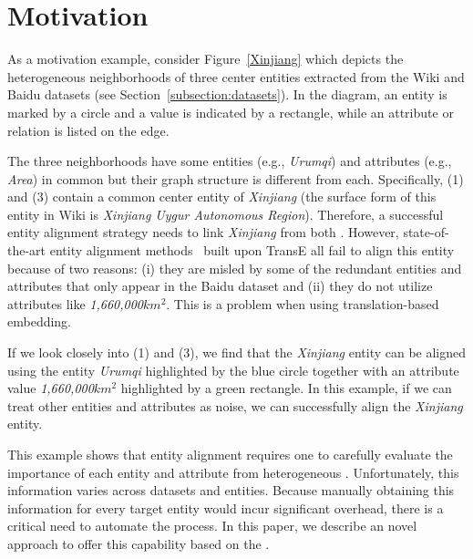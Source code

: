 \section{Motivation}
As a motivation example, consider Figure~\ref{Xinjiang} which depicts the heterogeneous neighborhoods of three center entities extracted from the Wiki and Baidu
datasets (see Section~\ref{subsection:datasets}). In the diagram, an entity is marked by a circle and a value is indicated by a rectangle,
while an attribute or relation is listed on the edge.

The three neighborhoods have some entities (e.g., \emph{Urumqi}) and attributes (e.g., \emph{Area}) in common but their graph structure is
different from each. Specifically, \KGs (1) and (3) contain a common center entity of \emph{Xinjiang} (the surface form of this entity in
Wiki is \emph{Xinjiang Uygur Autonomous Region}). Therefore, a successful entity alignment strategy needs to link \emph{Xinjiang} from both
\KGs. However, state-of-the-art entity alignment methods~\cite{hao2016joint,chen2016multilingual,sun2017cross,zhu2017iterative} built upon
TransE all fail to align this entity because of two reasons: (i) they are misled by some of the redundant entities and attributes that only
appear in the Baidu dataset and (ii) they do not utilize attributes like \emph{1,660,000$km^2$}. This is a problem when using
translation-based embedding.

If we look closely into \KGs (1) and (3), we find that the \emph{Xinjiang} entity can be aligned using the entity \emph{Urumqi} highlighted
by the blue circle together with an attribute value \emph{1,660,000$km^2$} highlighted by a green rectangle. In this example, if we can
treat other entities and attributes as noise, we can successfully align the \emph{Xinjiang} entity.

This example shows that entity alignment requires one to carefully evaluate the importance of each entity and attribute from heterogeneous
\KGs. Unfortunately, this information varies across datasets and entities. Because manually obtaining this information for every target
entity would incur significant overhead, there is a critical need to automate the process. In this paper, we describe an novel approach to
offer this capability based on the \RGCN.
